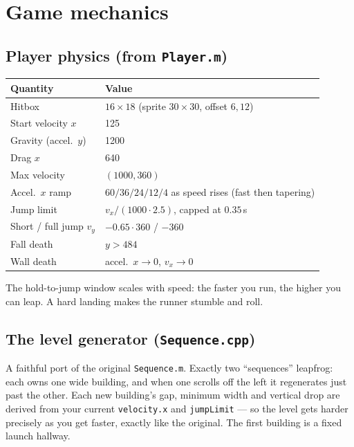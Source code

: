 \documentclass[11pt]{report}
\newcommand{\code}[1]{\texttt{#1}}
\begin{document}
\chapter{Game mechanics}\label{ch:mech}
\section{Player physics (from \code{Player.m})}
\begin{longtable}{ll}
\toprule
Quantity & Value \\
\midrule
\endhead
Hitbox & $16 \times 18$ (sprite $30\times30$, offset $6,12$) \\
Start velocity $x$ & 125 \\
Gravity (accel.\ $y$) & 1200 \\
Drag $x$ & 640 \\
Max velocity & $(1000, 360)$ \\
Accel.\ $x$ ramp & $60/36/24/12/4$ as speed rises (fast then tapering) \\
Jump limit & $v_x / (1000 \cdot 2.5)$, capped at $0.35$\,s \\
Short / full jump $v_y$ & $-0.65\cdot360$ / $-360$ \\
Fall death & $y > 484$ \\
Wall death & accel.\ $x \to 0$, $v_x \to 0$ \\
\bottomrule
\end{longtable}
The hold-to-jump window scales with speed: the faster you run, the higher you can
leap. A hard landing makes the runner stumble and roll.

\section{The level generator (\code{Sequence.cpp})}
A faithful port of the original \code{Sequence.m}. Exactly two ``sequences''
leapfrog: each owns one wide building, and when one scrolls off the left it
regenerates just past the other. Each new building's gap, minimum width and
vertical drop are derived from your current \code{velocity.x} and \code{jumpLimit}
--- so the level gets harder precisely as you get faster, exactly like the
original. The first building is a fixed launch hallway.
\end{document}
